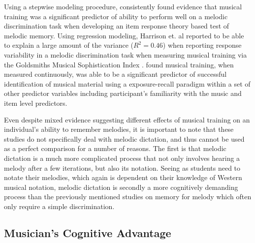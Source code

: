 \documentclass[12pt,]{book}
\begin{document}
Using a stepwise modeling procedure, \citet{harrisonModellingMelodicDiscrimination2016} consistently found evidence that musical training was a significant predictor of ability to perform well on a melodic discrimination task when developing an item response theory based test of melodic memory.
Using regression modeling, Harrison et. al reported to be able to explain a large amount of the variance (\(R^2 = 0.46\)) when reporting response variability in a melodic discrimination task \citep{harrisonApplyingModernPsychometric2017a} when measuring musical training via the Goldsmiths Musical Sophistication Index \citep{mullensiefenMusicalityNonMusiciansIndex2014}.
\citet{bakerPerceptionLeitmotivesRichard2017} found musical training, when measured continuously, was able to be a significant predictor of successful identification of musical material using a exposure-recall paradigm within a set of other predictor variables including participant's familiarity with the music and item level predictors.

Even despite mixed evidence suggesting different effects of musical training on an individual's ability to remember melodies, it is important to note that these studies do not specifically deal with melodic dictation, and thus cannot be used as a perfect comparison for a number of reasons.
The first is that melodic dictation is a much more complicated process that not only involves hearing a melody after a few iterations, but also its notation.
Seeing as students need to notate their melodies, which again is dependent on their knowledge of Western musical notation, melodic dictation is secondly a more cognitively demanding process than the previously mentioned studies on memory for melody which often only require a simple discrimination.

\hypertarget{musicians-cognitive-advantage}{%
\subsection{Musician's Cognitive Advantage}\label{musicians-cognitive-advantage}}
\end{document}
